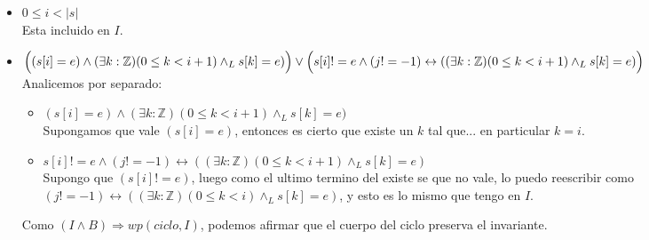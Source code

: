 \documentclass[a4paper]{article}
\begin{document}
	\begin{itemize}
		\item $ 0\leq i<|s|$\smallskip \\
		Esta incluido en $I$.
		\item $\Big((s[i]=e)\wedge (\exists k:\mathbb{Z})(0\leq k<i+1)\wedge_L s[k]=e)\Big) \vee\\
   	\Big( s[i]!=e\wedge (j!=-1)\leftrightarrow ((\exists k:\mathbb{Z})(0\leq k<i+1)\wedge_L s[k]=e)\Big)$\smallskip \\
		Analicemos por separado:
		\begin{itemize}
		\item $(s[i]=e)\wedge (\exists k:\mathbb{Z})(0\leq k<i+1)\wedge_L s[k]=e)$\\
		Supongamos que vale $(s[i]=e)$, entonces es cierto que existe un $k$ tal que... en 
		particular $k=i$.
		\item  $s[i]!=e\wedge (j!=-1)\leftrightarrow ((\exists k:\mathbb{Z})(0\leq k<i+1)\wedge_L s[k]=e)$\\
		Supongo que $(s[i]!=e)$, luego como el ultimo termino del existe se que no vale, lo puedo reescribir como
			$ (j!=-1)\leftrightarrow ((\exists k:\mathbb{Z})(0\leq k<i)\wedge_L s[k]=e)$, y esto es lo mismo que tengo en $I$.
		\end{itemize}
		Como $(I\wedge B) \Rightarrow wp(ciclo,I)$, podemos afirmar que el cuerpo del ciclo preserva el invariante.
	\end{itemize}
	
\end{document}

